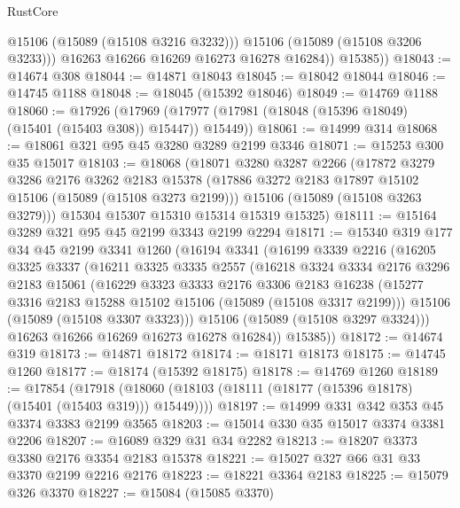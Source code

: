 \begin{lexlean}{RustCore}
\begin{coremodule}
                @15106
                (@15089 (@15108 @3216 @3232)))
              @15106
              (@15089 (@15108 @3206 @3233)))
            @16263
            @16266
            @16269
            @16273
            @16278
            @16284))
        @15385))
@18043 := @14674 @308
@18044 := @14871 @18043
@18045 := @18042 @18044
@18046 := @14745 @1188
@18048 := @18045 (@15392 @18046)
@18049 := @14769 @1188
@18060 := @17926
    (@17969 (@17977 (@17981 (@18048 (@15396 @18049) (@15401 (@15403 @308)) @15447)) @15449))
@18061 := @14999 @314
@18068 := @18061 @321 @95 @45 @3280 @3289 @2199 @3346
@18071 := @15253 @300 @35 @15017
@18103 := @18068
    (@18071
      @3280
      @3287
      @2266
      (@17872
        @3279
        @3286
        @2176
        @3262
        @2183
        @15378
        (@17886 @3272 @2183 @17897 @15102 @15106 (@15089 (@15108 @3273 @2199)))
        @15106
        (@15089 (@15108 @3263 @3279)))
      @15304
      @15307
      @15310
      @15314
      @15319
      @15325)
@18111 := @15164 @3289 @321 @95 @45 @2199 @3343 @2199 @2294
@18171 := @15340
    @319
    @177
    @34
    @45
    @2199
    @3341
    @1260
    (@16194
      @3341
      (@16199
        @3339
        @2216
        (@16205
          @3325
          @3337
          (@16211
            @3325
            @3335
            @2557
            (@16218
              @3324
              @3334
              @2176
              @3296
              @2183
              @15061
              (@16229
                @3323
                @3333
                @2176
                @3306
                @2183
                @16238
                (@15277 @3316 @2183 @15288 @15102 @15106 (@15089 (@15108 @3317 @2199)))
                @15106
                (@15089 (@15108 @3307 @3323)))
              @15106
              (@15089 (@15108 @3297 @3324)))
            @16263
            @16266
            @16269
            @16273
            @16278
            @16284))
        @15385))
@18172 := @14674 @319
@18173 := @14871 @18172
@18174 := @18171 @18173
@18175 := @14745 @1260
@18177 := @18174 (@15392 @18175)
@18178 := @14769 @1260
@18189 := @17854
    (@17918 (@18060 (@18103 (@18111 (@18177 (@15396 @18178) (@15401 (@15403 @319))) @15449))))
@18197 := @14999 @331 @342 @353 @45 @3374 @3383 @2199 @3565
@18203 := @15014 @330 @35 @15017 @3374 @3381 @2206
@18207 := @16089 @329 @31 @34 @2282
@18213 := @18207 @3373 @3380 @2176 @3354 @2183 @15378
@18221 := @15027 @327 @66 @31 @33 @3370 @2199 @2216 @2176
@18223 := @18221 @3364 @2183
@18225 := @15079 @326 @3370
@18227 := @15084 (@15085 @3370)

\end{coremodule}
\end{lexlean}
